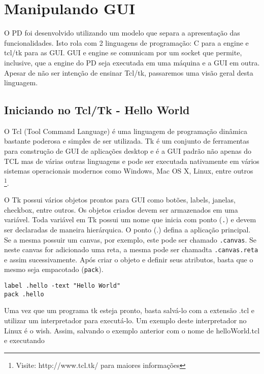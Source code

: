 \chapter{Manipulando GUI}

O PD foi desenvolvido utilizando um modelo que separa a apresentação das
funcionalidades.
Isto rola com 2 linguagens de programação: C para a engine e tcl/tk para as GUI.
GUI e engine se comunicam por um socket que permite, inclusive, que a engine
do PD seja executada em uma máquina e a GUI em outra.
Apesar de não ser intenção de ensinar Tcl/tk, passaremos uma visão geral desta
linguagem.


\section{Iniciando no Tcl/Tk - Hello World}
O Tcl (Tool Command Language) é uma linguagem de programação dinâmica bastante
poderosa e simples de ser utilizada. 
Tk é um conjunto de ferramentas para construção de GUI de aplicações desktop e é
a GUI padrão não apenas do TCL mas de várias outras linguagens e pode ser
executada nativamente em vários sistemas operacionais modernos como Windows, Mac
OS X, Linux, entre outros \footnote{Visite: http://www.tcl.tk/ para maiores
informações}.

O Tk possui vários objetos prontos para GUI como botões, labels, janelas,
checkbox, entre outros.
Os objetos criados devem ser armazenados em uma variável.
Toda variável em Tk possui um nome que inicia com ponto (\texttt{.}) e devem ser declaradas
de maneira hierárquica.
O ponto (.) defina a aplicação principal.
Se a mesma possuir um canvas, por exemplo, este pode ser chamado \texttt{.canvas}.
Se neste canvas for adicionado uma reta, a mesma pode ser chamadta \texttt{.canvas.reta}
e assim sucessivamente.
Após criar o objeto e definir seus atributos, basta que o mesmo seja empacotado
(\texttt{pack}).

\begin{lstlisting}[caption=Exemplo de Hello World]
label .hello -text "Hello World"
pack .hello
\end{lstlisting}

Uma vez que um programa tk esteja pronto, basta salvá-lo com a extensão .tcl e
utilizar um interpretador para executá-lo.
Um exemplo deste interpretador no Linux é o wish. Assim, salvando o exemplo anterior com o nome de helloWorld.tcl e executando

